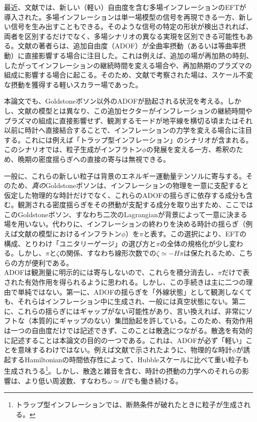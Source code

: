 最近、文献\cite{multieft}では、新しい（軽い）自由度を含む多場インフレーションのEFTが導入された。多場インフレーションは単一場模型の信号を再現できる一方、新しい信号を生み出すこともできる。そのような信号の特定の形状が検出されれば、両者を区別するだけでなく、多場シナリオの異なる実現を区別できる可能性もある。文献\cite{multieft}の著者らは、追加自由度（ADOF）が全曲率摂動（あるいは等曲率摂動）に直接影響する場合に注目した。これは例えば、追加の場が再加熱の時刻、したがってインフレーションの継続時間を変える場合や、再加熱期のプラズマの組成に影響する場合に起こる。そのため、文献\cite{multieft}で考察された場は、スケール不変な摂動を獲得する軽いスカラー場であった。

本論文でも、Goldstoneボソン以外のADOFが励起される状況を考える。しかし、文献\cite{multieft}の模型とは異なり、この追加セクターがインフレーションの継続時間やプラズマの組成に直接影響せず、観測するモードが地平線を横切る頃またはそれ以前に時計へ直接結合することで、インフレーションの力学を変える場合に注目する。これには例えば「トラップ型インフレーション」のシナリオ\cite{trapped}が含まれる。このシナリオでは、粒子生成がインフラトン$\phi$の発展を変える一方、希釈のため、晩期の密度揺らぎへの直接の寄与は無視できる。

一般に、これらの新しい粒子は背景のエネルギー運動量テンソルに寄与する。そのため、{\it 真の}Goldstoneボソンは、インフレーションの物理を一意に支配すると仮定した物理的な時計だけでなく、これらのADOFの揺らぎに依存する成分も含む。観測される密度揺らぎをその摂動が支配する成分を取り出すため、ここではこのGoldstoneボソン、すなわち二次のLagrangianが背景によって一意に決まる場を用いない。代わりに、インフレーションの終わりを決める時計の揺らぎ（例えば文献\cite{trapped}の模型におけるインフラトン$\phi$）を$\pi$と表す。この選択により、EFTの構成、とりわけ「ユニタリーゲージ」の選び方と$\pi$の全体の規格化が少し変わる。しかし、$\pi$と$\zeta$の関係、すなわち線形次数での$\zeta \simeq -H\pi$は保たれるため、こちらの方が便利である。\\

ADOFは観測量に明示的には寄与しないので、これらを積分消去し、$\pi$だけで表された有効作用を得られるように思われる。しかし、この手続きは主に二つの理由で単純ではない。第一に、ADOFの揺らぎを「外線状態」として観測しなくても、それらはインフレーション中に生成され、一般には真空状態にない。第二に、これらの揺らぎにはギャップがない可能性があり、言い換えれば、非常にソフトな（本質的にギャップのない）集団励起を許している。このため、有効作用は一つの自由度だけでは記述できず、このことは散逸につながる。散逸を有効的に記述することは本論文の目的の一つである。これは、ADOFが必ず「軽い」ことを意味するわけではない。例えば文献\cite{trapped}で示されたように、物理的な時計$\phi$が誘起するHamiltonianの時間依存性によって、Hubbleスケールに比べて重い粒子も生成されうる\footnote{トラップ型インフレーションでは、断熱条件が破れたときに粒子が生成される\cite{beauty,trapped}。}。しかし、散逸と雑音を含む、時計の摂動の力学へのそれらの影響は、より低い周波数、すなわち$\omega \simeq H$でも働き続ける。\\

